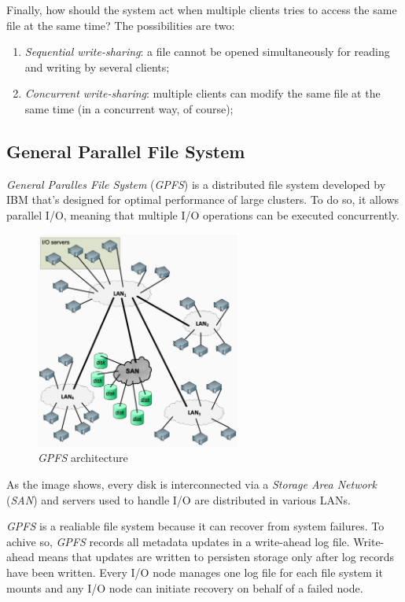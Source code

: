 \noindent
Finally, how should the system act when multiple clients tries to access the
same file at the same time? The possibilities are two:
\begin{enumerate}
    \item \emph{Sequential write-sharing}: a file cannot be opened simultaneously
    for reading and writing by several clients;
    \item \emph{Concurrent write-sharing}: multiple clients can modify the same
    file at the same time (in a concurrent way, of course);
\end{enumerate}

\subsection{General Parallel File System}
\emph{General Paralles File System} (\emph{GPFS}) is a distributed file
system developed by IBM that's designed for optimal performance of large
clusters. To do so, it allows parallel I/O, meaning that multiple I/O
operations can be executed concurrently.

\begin{figure}[h!]
    \centering
    \includegraphics[width=0.6\textwidth]{images/gpfs-design.png}
    \caption{\emph{GPFS} architecture}
\end{figure}

\noindent
As the image shows, every disk is interconnected via a \emph{Storage Area Network}
(\emph{SAN}) and servers used to handle I/O are distributed in various LANs.

\emph{GPFS} is a realiable file system because it can recover from system
failures. To achive so, \emph{GPFS} records all metadata updates in a write-ahead
log file. Write-ahead means that updates are written to persisten storage only
after log records have been written. Every I/O node manages one log file for
each file system it mounts and any I/O node can initiate recovery on behalf of
a failed node.

